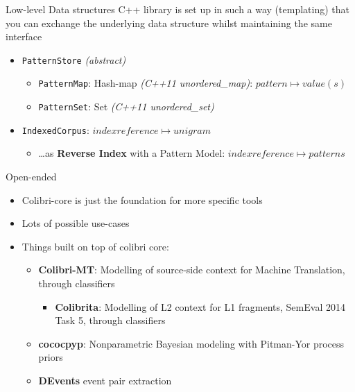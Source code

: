 \documentclass[compress]{beamer}
\begin{document}
\begin{frame}

  \begin{block}{Low-level Data structures}
     C++ library is set up in such a way (templating) that you can exchange the
      underlying data structure whilst maintaining the same interface

    \begin{itemize}
      \item \texttt{PatternStore} \emph{(abstract)}
      \begin{itemize}
        \item \texttt{PatternMap}: Hash-map \emph{(C++11 unordered\_map)}:
          ${pattern} \mapsto {value(s)}$
        \item \texttt{PatternSet}: Set \emph{(C++11 unordered\_set)}
      \end{itemize}
      \item \texttt{IndexedCorpus}: ${indexreference} \mapsto {unigram}$
      \begin{itemize}
        \item \ldots as \textbf{Reverse Index} with a Pattern Model: ${indexreference} \mapsto {patterns}$
      \end{itemize}
    \end{itemize}
  \end{block}

\end{frame}



\begin{frame}
  \begin{block}{Open-ended}
    \begin{itemize}
      \item Colibri-core is just the foundation for more specific tools
      \item Lots of possible use-cases
      \item Things built on top of colibri core:
      \begin{itemize}
        \item \textbf{Colibri-MT}: Modelling of source-side context for Machine
          Translation, through classifiers
        \begin{itemize}
          \item \textbf{Colibrita}: Modelling of L2 context for L1 fragments, SemEval
            2014 Task 5, through classifiers
        \end{itemize}
        \item \textbf{cococpyp}: Nonparametric Bayesian modeling with Pitman-Yor process priors
        \item \textbf{DEvents} event pair extraction
      \end{itemize}
    \end{itemize}
  \end{block}
\end{frame}
\end{document}
